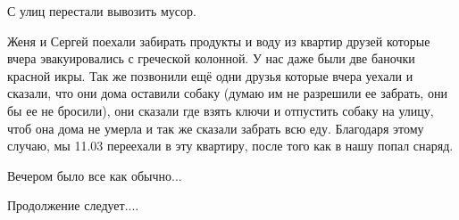 С улиц перестали вывозить мусор. 

Женя и Сергей поехали забирать продукты и воду из квартир друзей которые вчера
эвакуировались с греческой колонной. У нас даже были две баночки красной икры.
Так же позвонили ещё одни друзья которые вчера уехали и сказали, что они дома
оставили собаку (думаю им не разрешили ее забрать, они бы ее не бросили), они
сказали где взять ключи и отпустить собаку на улицу, чтоб она дома не умерла и
так же сказали забрать всю еду.  Благодаря этому случаю, мы 11.03 переехали в
эту квартиру, после того как в нашу попал снаряд. 

Вечером было все как обычно...

Продолжение следует....

